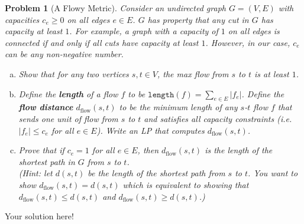\documentclass[10pt]{article}
\newtheorem{problem}{\sc\color{cit}Problem}
\begin{document}
\begin{problem}[A Flowy Metric]
Consider an undirected graph $G = (V, E)$ with capacities $c_e\ge 0$ on all edges $e \in E$. $G$ has property that any cut in $G$ has capacity at least $1$. For example, a graph with a capacity of $1$ on all edges is connected if and only if all cuts have capacity at least $1$. However, in our case, $c_e$ can be any non-negative number.
\begin{enumerate}[(a)]
    \item Show that for any two vertices $s, t \in V$, the max flow from $s$ to $t$ is at least $1$.
    \item Define the \textbf{length} of a flow $f$ to be $\texttt{length}(f) = \sum_{e\in E} |f_e|$. Define the \textbf{flow distance} $d_{\text{flow}} (s,t)$ to be the minimum length of any $s$-$t$ flow $f$ that sends one unit of flow from $s$ to $t$ and satisfies all capacity constraints (i.e. $|f_e|\le c_e$ for all $e \in E$). Write an LP that computes $d_{\text{flow}} (s,t)$. 
    \item Prove that if $c_e = 1$ for all $e\in E$, then $d_{\text{flow}} (s,t)$ is the length of the shortest path in $G$ from $s$ to $t$. \\
    (Hint: let $d(s,t)$ be the length of the shortest path from $s$ to $t$. You want to show $d_{\text{flow}} (s,t) = d(s,t)$ which is equivalent to showing that $d_{\text{flow}} (s,t) \le d(s,t)$ and $d_{\text{flow}} (s,t) \ge d(s,t)$.)
\end{enumerate}
\end{problem}

\begin{solution}
Your solution here!
\end{solution}


\newpage

\end{document}
